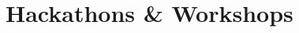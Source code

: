\documentclass[a4paper,10pt]{extarticle} %
\begin{document}
\begin{tabular}{r|p{17.5cm}}

\end{tabular}

\vspace{-0.3cm}
\section{Hackathons \& Workshops}
\end{document}
